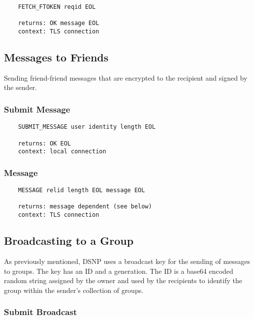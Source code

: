 \documentclass[letterpaper,11pt,oneside]{article}
\begin{document}
\vspace{10pt}
\begin{verbatim}
    FETCH_FTOKEN reqid EOL

    returns: OK message EOL
    context: TLS connection
\end{verbatim}

\subsection{Messages to Friends}

Sending friend-friend messages that are encrypted to the recipient and signed
by the sender. 

\subsubsection{Submit Message}

\vspace{10pt}
\begin{verbatim}
    SUBMIT_MESSAGE user identity length EOL

    returns: OK EOL
    context: local connection
\end{verbatim}
\vspace{10pt}

\subsubsection{Message}

\vspace{10pt}
\begin{verbatim}
    MESSAGE relid length EOL message EOL

    returns: message dependent (see below)
    context: TLS connection
\end{verbatim}

\subsection{Broadcasting to a Group}

As previously mentioned, DSNP uses a broadcast key for the sending of messages
to groups. The key has an ID and a generation. The ID is a base64 encoded
random string assigned by the owner and used by the recipients to identify the
group within the sender's collection of groups.

\subsubsection{Submit Broadcast}
\end{document}
